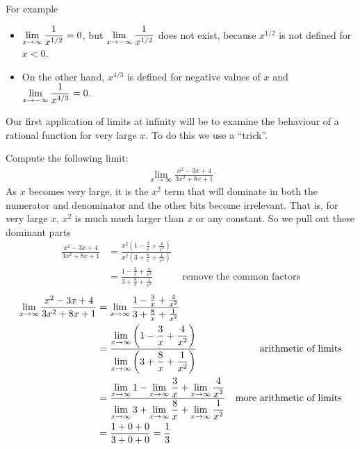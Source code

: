For example
\begin{itemize}
 \item $\displaystyle \lim_{x \to \infty} \frac{1}{x^{1/2}} = 0$, but $\displaystyle \lim_{x \to
-\infty} \frac{1}{x^{1/2}}$ does not exist, because $x^{1/2}$ is not defined for
$x<0$.
\item On the other hand, $x^{4/3}$ is defined for negative values of $x$
and $\displaystyle \lim_{x \to -\infty} \frac{1}{x^{4/3}} = 0$.
\end{itemize}

Our first application of limits at infinity will be to examine the behaviour of
a rational function for very large $x$. To do this we use a ``trick''.
\begin{eg}
Compute the following limit:
\begin{align*}
\lim_{x \to \infty} \frac{x^2-3x+4}{3x^2+8x+1}
\end{align*}
As $x$ becomes very  large, it is the $x^2$ term that will dominate in both the
numerator and denominator and the other bits become irrelevant. That is,
for very large $x$, $x^2$ is much much larger than $x$ or any constant. So we
pull out these dominant parts
\begin{align*}
  \frac{x^2-3x+4}{3x^2+8x+1}
  &= \frac{x^2 \left(1-\frac{3}{x}+\frac{4}{x^2}\right)}
  {x^2 \left(3+\frac{8}{x}+\frac{1}{x^2} \right)}\\
  &= \frac{1-\frac{3}{x}+\frac{4}{x^2}}
  {3+\frac{8}{x}+\frac{1}{x^2}} & \text{ remove the common factors}
\end{align*}
\begin{align*}
  \lim_{x \to \infty} \frac{x^2-3x+4}{3x^2+8x+1}
  &= \lim_{x \to \infty} \frac{1-\frac{3}{x}+\frac{4}{x^2}}
  {3+\frac{8}{x}+\frac{1}{x^2}}\\
  &= \frac{\displaystyle \lim_{x \to \infty}\left(1-\frac{3}{x}+\frac{4}{x^2}\right)}
{\displaystyle \lim_{x \to \infty}\left(3+\frac{8}{x}+\frac{1}{x^2} \right)}
& \text{arithmetic of limits} \\
  &= \frac{\displaystyle \lim_{x \to \infty} 1
  - \lim_{x \to \infty} \frac{3}{x} + \lim_{x \to \infty} \frac{4}{x^2}}
{\displaystyle \lim_{x \to \infty} 3
 + \lim_{x \to \infty} \frac{8}{x}+ \lim_{x \to \infty} \frac{1}{x^2} }
& \text{more arithmetic of limits} \\
  &= \frac{1+0+0}{3+0+0}  = \frac{1}{3}
\end{align*}
\end{eg}

